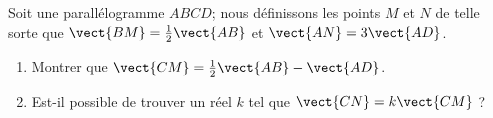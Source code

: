 
\begin{exercice}\label{exosmath-0665}

    Soit une parallélogramme \( ABCD\); nous définissons les points \( M\) et \( N\) de telle sorte que \( \vect{ BM }=\frac{ 1 }{2}\vect{ AB }\) et \( \vect{ AN }=3\vect{ AD }\).

    \begin{enumerate}
        \item
            Montrer que \( \vect{ CM }=\frac{ 1 }{2}\vect{ AB }-\vect{ AD }\).
        \item
            Est-il possible de trouver un réel \( k\) tel que \( \vect{ CN }=k\vect{ CM }\) ?
    \end{enumerate}

\end{exercice}
